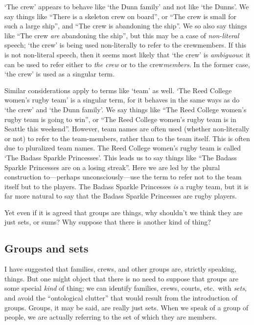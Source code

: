 \documentclass[12pt,twoside]{reedfancy}
\begin{document}
\begin{spacing}{1.25}
`The crew' appears to behave like `the Dunn family' and not like `the
Dunns'.  We say things like ``There is a skeleton crew on board'', or
``The crew is small for such a large ship'', and ``The crew is
abandoning the ship''.  We so also say things like ``The crew {\em
  are} abandoning the ship'', but this may be a case of {\em
  non-literal} speech; `the crew' is being used non-literally to refer
to the crewmembers.  If this is not non-literal speech, then it seems
most likely that `the crew' is {\em ambiguous}: it can be used to
refer either to {\em the crew} or to the crew{\em members}.  In the
former case, `the crew' is used as a singular term.

Similar considerations apply to terms like `team' as well.  `The Reed
College women's rugby team' is a singular term, for it behaves in the
same ways as do `the crew' and `the Dunn family'.  We say things like
``The Reed College women's rugby team is going to win'', or ``The Reed
College women's rugby team is in Seattle this weekend''.  However,
team names are often used (whether non-literally or not) to refer to
the team-members, rather than to the team itself.  This is often due
to pluralized team names.  The Reed College women's rugby team is
called `The Badass Sparkle Princesses'.  This leads us to say things
like ``The Badass Sparkle Princesses are on a losing streak''.  Here
we are led by the plural construction to---perhaps unconsciously---use
the term to refer not to the team itself but to the players.  The
Badass Sparkle Princesses {\em is} a rugby team, but it is far more
natural to say that the Badass Sparkle Princesses are rugby players.

Yet even if it is agreed that groups are things, why shouldn't we
think they are just sets, or sums?  Why suppose that there is another
kind of thing?

\subsection{Groups and sets}
\label{group-set}
I have suggested that families, crews, and other groups are, strictly
speaking, things.  But one might object that there is no need to
suppose that groups are some special {\em kind} of thing; we can
identify families, crews, courts, etc.\ with {\em sets}, and avoid the
``ontological clutter'' that would result from the introduction of
groups.  Groups, it may be said, are really just sets.  When we speak
of a group of people, we are actually referring to the set of which
they are members.


\end{spacing}
\end{document}
